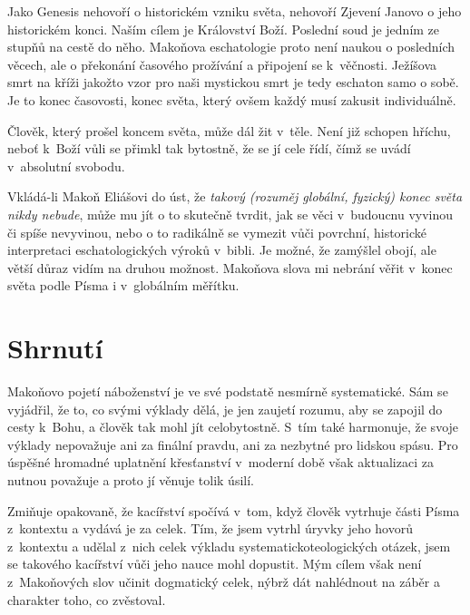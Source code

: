 Jako Genesis nehovoří o historickém vzniku světa, nehovoří Zjevení Janovo o jeho
historickém konci. Naším cílem je Království Boží. Poslední soud je jedním ze
stupňů na cestě do něho. Makoňova eschatologie proto není naukou o posledních
věcech, ale o překonání časového prožívání a připojení se k~věčnosti. Ježíšova
smrt na kříži jakožto vzor pro naši mystickou smrt je tedy eschaton samo o sobě.
Je to konec časovosti, konec světa, který ovšem každý musí zakusit individuálně.

Člověk, který prošel koncem světa, může dál žit v~těle. Není již schopen hříchu,
neboť k~Boží vůli se přimkl tak bytostně, že se jí cele řídí, čímž se uvádí
v~absolutní svobodu.

Vkládá-li Makoň Eliášovi do úst, že \textit{takový (rozuměj globální, fyzický)
konec světa nikdy nebude}, může mu jít o to skutečně tvrdit, jak se věci
v~budoucnu vyvinou či spíše nevyvinou, nebo o to radikálně se vymezit vůči
povrchní, historické interpretaci eschatologických výroků v~bibli. Je možné, že
zamýšlel obojí, ale větší důraz vidím na druhou možnost. Makoňova slova mi
nebrání věřit v~konec světa podle Písma i v~globálním měřítku.

\section{Shrnutí}

Makoňovo pojetí náboženství je ve své podstatě nesmírně systematické. Sám se
vyjádřil, že to, co svými výklady dělá, je jen zaujetí rozumu, aby se zapojil do
cesty k~Bohu, a člověk tak mohl jít celobytostně. S~tím také harmonuje, že svoje
výklady nepovažuje ani za finální pravdu, ani za nezbytné pro lidskou spásu. Pro
úspěšné hromadné uplatnění křesťanství v~moderní době však aktualizaci za nutnou
považuje a proto jí věnuje tolik úsilí.

Zmiňuje opakovaně, že kacířství spočívá v~tom, když člověk vytrhuje části Písma
z~kontextu a vydává je za celek. Tím, že jsem vytrhl úryvky jeho hovorů
z~kontextu a udělal z~nich celek výkladu systematicko\-teologických otázek, jsem
se takového kacířství vůči jeho nauce mohl dopustit. Mým cílem však není
z~Makoňových slov učinit dogmatický celek, nýbrž dát nahlédnout na záběr a
charakter toho, co zvěstoval.
